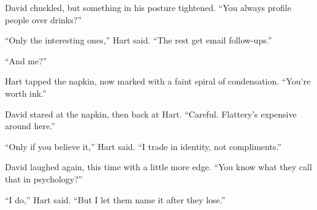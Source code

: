 David chuckled, but something in his posture tightened. ``You always profile people over drinks?''

``Only the interesting ones,'' Hart said. ``The rest get email follow-ups.''

``And me?''

Hart tapped the napkin, now marked with a faint spiral of condensation. ``You’re worth ink.''

David stared at the napkin, then back at Hart. ``Careful. Flattery’s expensive around here.''

``Only if you believe it,'' Hart said. ``I trade in identity, not compliments.''

David laughed again, this time with a little more edge. ``You know what they call that in psychology?''

``I do,'' Hart said. ``But I let them name it after they lose.''

